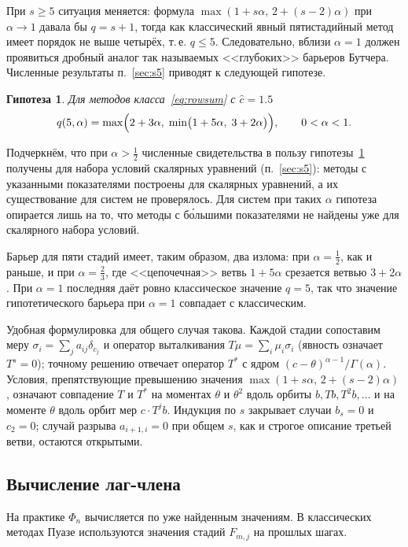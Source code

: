 \documentclass[11pt,a4paper]{article}
\theoremstyle{plain}
\newtheorem{conjecture}{Гипотеза}
\theoremstyle{definition}
\newcommand{\G}{\Gamma}
\begin{document}
При $s\ge5$ ситуация меняется: формула $\max(1+s\alpha,\,2+(s-2)\alpha)$ при $\alpha\to1$ давала бы $q=s+1$, тогда как классический явный пятистадийный метод имеет порядок не выше четырёх, т.\,е. $q\le5$. Следовательно, вблизи $\alpha=1$ должен проявиться дробный аналог так называемых <<глубоких>> барьеров Бутчера. Численные результаты п.~\ref{sec:s5} приводят к следующей гипотезе.

\begin{conjecture}\label{conj5}
Для методов класса~\eqref{eq:rowsum} с $\hat c=1.5$
\[
q(5,\alpha)=\max\Bigl(2+3\alpha,\;\min\bigl(1+5\alpha,\;3+2\alpha\bigr)\Bigr),\qquad 0<\alpha<1 .
\]
\end{conjecture}

Подчеркнём, что при $\alpha>\frac12$ численные свидетельства в пользу гипотезы~\ref{conj5} получены для набора условий скалярных уравнений (п.~\ref{sec:s5}): методы с указанными показателями построены для скалярных уравнений, а их существование для систем не проверялось. Для систем при таких $\alpha$ гипотеза опирается лишь на то, что методы с бо́льшими показателями не найдены уже для скалярного набора условий.

Барьер для пяти стадий имеет, таким образом, два излома: при $\alpha=\frac12$, как и раньше, и при $\alpha=\frac23$, где <<цепочечная>> ветвь $1+5\alpha$ срезается ветвью $3+2\alpha$. При $\alpha=1$ последняя даёт ровно классическое значение $q=5$, так что значение гипотетического барьера при $\alpha=1$ совпадает с классическим.

Удобная формулировка для общего случая такова. Каждой стадии сопоставим меру $\sigma_i=\sum_ja_{ij}\delta_{c_j}$ и оператор выталкивания $T\mu=\sum_i\mu_i\sigma_i$ (явность означает $T^s=0$); точному решению отвечает оператор $T^{*}$ с ядром $(c-\theta)^{\alpha-1}/\G(\alpha)$. Условия, препятствующие превышению значения $\max(1+s\alpha,\,2+(s-2)\alpha)$, означают совпадение $T$ и $T^{*}$ на моментах $\theta$ и $\theta^2$ вдоль орбиты $b,Tb,T^2b,\dots$ и на моменте $\theta$ вдоль орбит мер $c\cdot T^jb$. Индукция по $s$ закрывает случаи $b_s=0$ и $c_2=0$; случай разрыва $a_{i+1,i}=0$ при общем $s$, как и строгое описание третьей ветви, остаются открытыми.
\subsection{Вычисление лаг-члена}\label{sec:lag}

На практике $\Phi_n$ вычисляется по уже найденным значениям. В классических методах Пуазе используются значения стадий $F_{m,j}$ на прошлых шагах.
\end{document}
